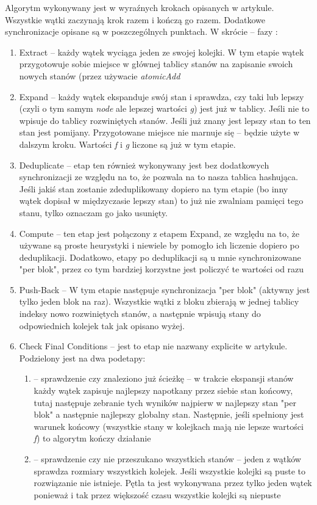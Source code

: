 \documentclass{article}
\begin{document}
Algorytm wykonywany jest w wyraźnych krokach opisanych w artykule. Wszystkie wątki zaczynają krok razem i kończą go razem. Dodatkowe 
synchronizacje opisane są w poszczególnych punktach. W skrócie -- fazy :
\begin{enumerate}
\item Extract -- każdy wątek wyciąga jeden ze swojej kolejki. W tym etapie wątek przygotowuje sobie miejsce w głównej tablicy stanów
        na zapisanie swoich nowych stanów (przez używacie \emph{atomicAdd}
\item Expand -- każdy wątek ekspanduje swój stan i sprawdza, czy taki 
        lub lepszy (czyli o tym samym \emph{node} ale lepszej wartości \emph{g}) jest już w tablicy. Jeśli nie to wpisuje do tablicy rozwiniętych stanów. 
        Jeśli już znany jest lepszy stan to ten stan jest pomijany. Przygotowane miejsce nie marnuje się -- będzie użyte w dalszym kroku.
        Wartości \emph{f} i \emph{g} liczone są już w tym etapie. 
\item Deduplicate -- etap ten również wykonywany jest bez dodatkowych synchronizacji ze względu na to, że pozwala na to nasza tablica hashująca.
        Jeśli jakiś stan zostanie zdeduplikowany dopiero na tym etapie (bo inny wątek dopisał w międzyczasie lepszy stan) 
        to już nie zwalniam pamięci tego stanu, tylko oznaczam go jako usunięty.
\item Compute -- ten etap jest połączony z etapem Expand, ze względu na to, że używane są proste heurystyki i niewiele by pomogło ich liczenie
        dopiero po deduplikacji. Dodatkowo, etapy po deduplikacji są u mnie synchronizowane "per blok", przez co tym bardziej korzystne jest policzyć
        te wartości od razu
\item Push-Back -- W tym etapie następuje synchronizacja "per blok" (aktywny jest tylko jeden blok na raz). 
        Wszystkie wątki z bloku zbierają w jednej tablicy indeksy nowo rozwiniętych stanów, a następnie wpisują
        stany do odpowiednich kolejek tak jak opisano wyżej.
\item Check Final Conditions -- jest to etap nie nazwany explicite w artykule. Podzielony jest na dwa podetapy:
  \begin{enumerate}
    \item -- sprawdzenie czy znaleziono już ścieżkę -- w trakcie ekspansji stanów każdy wątek zapisuje najlepszy napotkany przez siebie stan końcowy,
           tutaj następuje zebranie tych wyników najpierw w najlepszy stan "per blok" a następnie najlepszy globalny stan. Następnie, jeśli spełniony jest
           warunek końcowy (wszystkie stany w kolejkach mają nie lepsze wartości \emph{f}) to algorytm kończy działanie
    \item -- sprawdzenie czy nie przeszukano wszystkich stanów -- jeden z wątków sprawdza rozmiary wszystkich kolejek. Jeśli wszystkie
           kolejki są puste to rozwiązanie nie istnieje. Pętla ta jest wykonywana przez tylko jeden wątek ponieważ i tak przez większość czasu
           wszystkie kolejki są niepuste
  \end{enumerate}
\end{enumerate}
\end{document}
